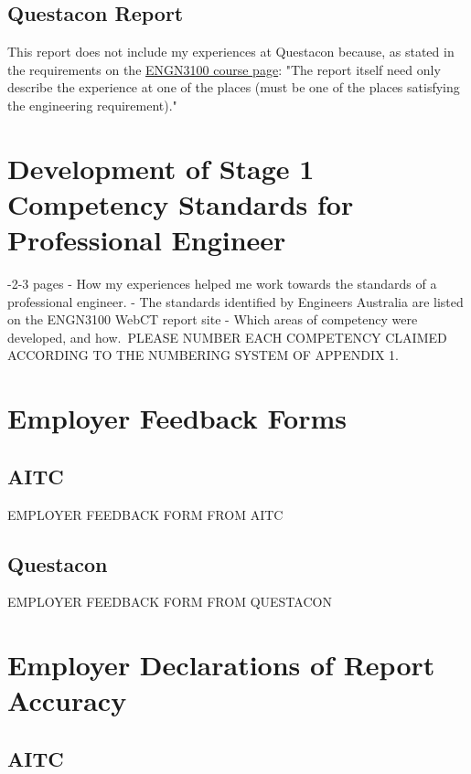 \documentclass[11pt]{article}
\begin{document}
\subsection{Questacon Report}

This report does not include my experiences at Questacon because, as stated in the requirements on the \href{http://programsandcourses.anu.edu.au/course/engn3100}{ENGN3100 course page}: "The report itself need only describe the experience at one of the places (must be one of the places satisfying the engineering requirement)."

\newpage

\section{Development of Stage 1 Competency Standards for Professional Engineer}

-2-3 pages
- How my experiences helped me work towards the standards of a
professional engineer.
- The standards identified by Engineers Australia are listed on the ENGN3100
WebCT report site
- Which areas of competency were developed, and how.\
PLEASE NUMBER EACH COMPETENCY CLAIMED ACCORDING TO THE
NUMBERING SYSTEM OF APPENDIX 1.

\newpage

\section{Employer Feedback Forms}

\subsection{AITC}

EMPLOYER FEEDBACK FORM FROM AITC

\newpage

\subsection{Questacon}

EMPLOYER FEEDBACK FORM FROM QUESTACON

\newpage

\section{Employer Declarations of Report Accuracy}

\subsection{AITC}
\end{document}
